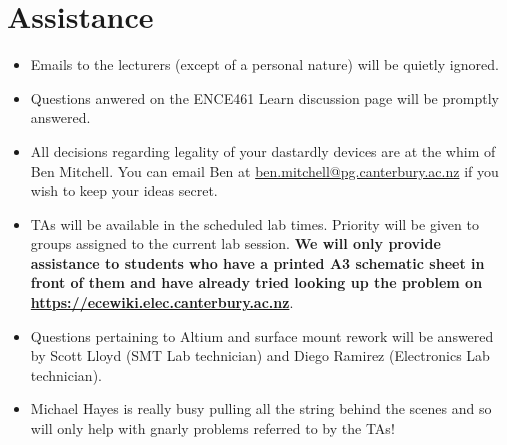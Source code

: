 \documentclass[11pt, a4paper]{article}
\begin{document}
\section{Assistance}


\begin{itemize}
\item Emails to the lecturers (except of a personal nature) will be
  quietly ignored.

\item Questions anwered on the ENCE461 Learn discussion page will be
  promptly answered.

\item All decisions regarding legality of your dastardly devices are
  at the whim of Ben Mitchell.  You can email Ben at
  \href{mailto://ben.mitchell@pg.canterbury.ac.nz}{ben.mitchell@pg.canterbury.ac.nz} if you wish to keep your ideas secret.

\item TAs will be available in the scheduled lab times.  Priority will
  be given to groups assigned to the current lab session. \textbf{We will
  only provide assistance to students who have a printed A3 schematic
  sheet in front of them and have already tried looking up the problem
  on \url{https://ecewiki.elec.canterbury.ac.nz}}.

\item Questions pertaining to Altium and surface mount rework will be
  answered by Scott Lloyd (SMT Lab technician) and Diego Ramirez
  (Electronics Lab technician).

\item Michael Hayes is really busy pulling all the string behind the
  scenes and so will only help with gnarly problems referred to by the
  TAs!

\end{itemize}
\end{document}
